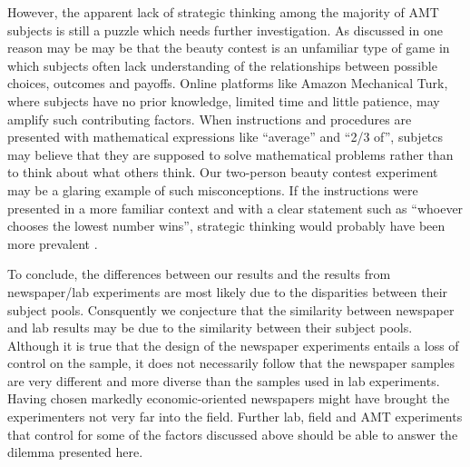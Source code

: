 \documentclass[12pt,review]{elsarticle}
\begin{document}
However, the apparent lack of strategic thinking among the majority of AMT subjects is still a puzzle which needs further investigation. As discussed in \citet{chou2009control} one reason may be may be that the beauty contest is an unfamiliar type of game in which subjects often lack understanding of the relationships between possible choices, outcomes and payoffs. Online platforms like Amazon Mechanical Turk, where subjects have no prior knowledge, limited time and little patience, may amplify such contributing factors. When instructions and procedures are presented with mathematical expressions like ``average'' and ``2/3 of'', subjetcs may believe that they are supposed to solve mathematical problems rather than to think about what others think. Our two-person beauty contest experiment may be a glaring example of such misconceptions. If the instructions were presented in a more familiar context and with a clear statement such as ``whoever chooses the lowest number wins'', strategic thinking would probably have been more prevalent \cite{chou2009control, bosch2019one}.

To conclude, the differences between our results and the results from newspaper/lab experiments are most likely due to the disparities between their subject pools. Consquently we conjecture that the similarity between newspaper and lab results may be due to the similarity between their subject pools. Although it is true that the design of the newspaper experiments entails a loss of control on the sample, it does not necessarily follow that the newspaper samples are very different and more diverse than the samples used in lab experiments. Having chosen markedly economic-oriented newspapers might have brought the experimenters not very far into the field. Further lab, field and AMT experiments that control for some of the factors discussed above should be able to answer the dilemma presented here.

  

\newpage
\appendix
\setcounter{page}{1}

\end{document}
